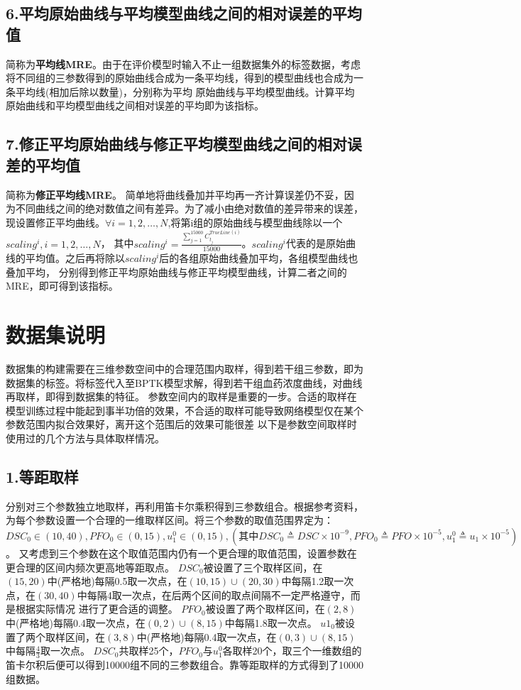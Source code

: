 \documentclass{article}
\begin{document}
\subsection*{6.平均原始曲线与平均模型曲线之间的相对误差的平均值}
简称为\textbf{平均线MRE}。由于在评价模型时输入不止一组数据集外的标签数据，考虑将不同组的三参数得到的原始曲线合成为一条平均线，得到的模型曲线也合成为一条平均线(相加后除以数量)，分别称为平均
原始曲线与平均模型曲线。计算平均原始曲线和平均模型曲线之间相对误差的平均即为该指标。
\subsection*{7.修正平均原始曲线与修正平均模型曲线之间的相对误差的平均值}
简称为\textbf{修正平均线MRE}。
简单地将曲线叠加并平均再一齐计算误差仍不妥，因为不同曲线之间的绝对数值之间有差异。为了减小由绝对数值的差异带来的误差，现设置修正平均曲线。$ \forall i=1,2,\dots,N $,将第i组的原始曲线与模型曲线除以一个$scaling^i,i=1,2,\dots,N$，
其中$scaling^i = \frac{\sum_{j = 1}^{15000} C^{TrueLine(i)}_{t_{j}}}{15000}$。$scaling^i$代表的是原始曲线的平均值。之后再将除以$scaling^i$后的各组原始曲线叠加平均，各组模型曲线也叠加平均，
分别得到修正平均原始曲线与修正平均模型曲线，计算二者之间的MRE，即可得到该指标。

\section*{数据集说明}
数据集的构建需要在三维参数空间中的合理范围内取样，得到若干组三参数，即为数据集的标签。将标签代入至BPTK模型求解，得到若干组血药浓度曲线，对曲线再取样，即得到数据集的特征。
参数空间内的取样是重要的一步。合适的取样在模型训练过程中能起到事半功倍的效果，不合适的取样可能导致网络模型仅在某个参数范围内拟合效果好，离开这个范围后的效果可能很差
以下是参数空间取样时使用过的几个方法与具体取样情况。

\subsection*{1.等距取样}
分别对三个参数独立地取样，再利用笛卡尔乘积得到三参数组合。根据参考资料，为每个参数设置一个合理的一维取样区间。将三个参数的取值范围界定为：$DSC_0\in (10,40),PFO_0\in (0,15),u_1^0\in (0,15),(其中DSC_0\triangleq DSC
\times 10^{-9},PFO_0 \triangleq PFO\times 10^{-5},u_1^0\triangleq u_1\times 10^{-5})$。
又考虑到三个参数在这个取值范围内仍有一个更合理的取值范围，设置参数在更合理的区间内频次更高地等距取点。
$DSC_0$被设置了三个取样区间，在$(15,20)$中(严格地)每隔0.5取一次点，在$(10,15)\cup (20,30)$中每隔1.2取一次点，在$(30,40)$中每隔4取一次点，在后两个区间的取点间隔不一定严格遵守，而是根据实际情况
进行了更合适的调整。
$PFO_0$被设置了两个取样区间，在$(2,8)$中(严格地)每隔0.4取一次点，在$(0,2)\cup (8,15)$中每隔1.8取一次点。
$u1_0$被设置了两个取样区间，在$(3,8)$中(严格地)每隔0.4取一次点，在$(0,3)\cup (8,15)$中每隔$\frac{4}{3}$取一次点。
$DSC_0$共取样25个，$PFO_0$与$u_1^0$各取样20个，取三个一维数组的笛卡尔积后便可以得到10000组不同的三参数组合。靠等距取样的方式得到了10000组数据。
\end{document}
